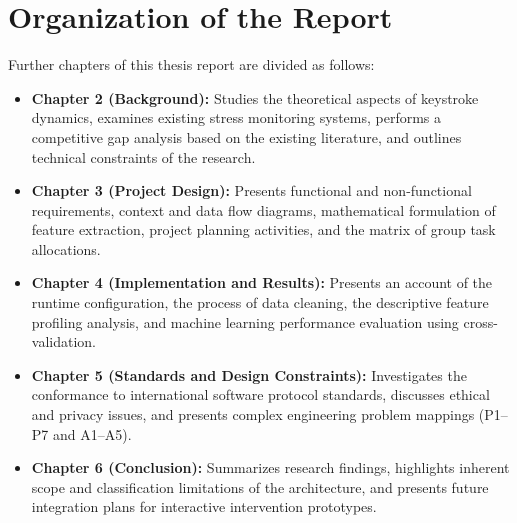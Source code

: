 \section{Organization of the Report}
Further chapters of this thesis report are divided as follows:
\begin{itemize}
    \item \textbf{Chapter 2 (Background):} Studies the theoretical aspects of keystroke dynamics, examines existing stress monitoring systems, performs a competitive gap analysis based on the existing literature, and outlines technical constraints of the research.
    
    \item \textbf{Chapter 3 (Project Design):} Presents functional and non-functional requirements, context and data flow diagrams, mathematical formulation of feature extraction, project planning activities, and the matrix of group task allocations.
    
    \item \textbf{Chapter 4 (Implementation and Results):} Presents an account of the runtime configuration, the process of data cleaning, the descriptive feature profiling analysis, and machine learning performance evaluation using cross-validation.
    
    \item \textbf{Chapter 5 (Standards and Design Constraints):} Investigates the conformance to international software protocol standards, discusses ethical and privacy issues, and presents complex engineering problem mappings (P1–P7 and A1–A5).
    
    \item \textbf{Chapter 6 (Conclusion):} Summarizes research findings, highlights inherent scope and classification limitations of the architecture, and presents future integration plans for interactive intervention prototypes.
\end{itemize}